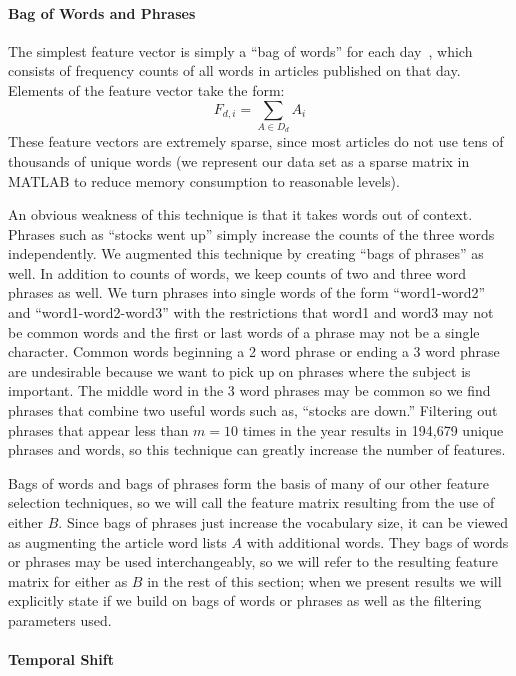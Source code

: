 \documentclass[10pt]{scrartcl}
\begin{document}
\paragraph{Bag of Words and Phrases}

The simplest feature vector is simply a ``bag of words'' for each day~\cite{featurehash}, which consists of frequency counts of all words in articles published on that day. Elements of the feature vector take the form: $$\displaystyle F_{d,i} = \sum_{A \in D_d}{A_i}$$ These feature vectors are extremely sparse, since most articles do not use tens of thousands of unique words (we represent our data set as a sparse matrix
in MATLAB to reduce memory consumption to reasonable levels).

An obvious weakness of this technique is that it takes words out of context. Phrases such as ``stocks went up'' simply increase the counts of the three words independently. We augmented this technique by creating ``bags of phrases'' as well. In addition to counts of words, we keep counts of two and three word phrases
as well. We turn phrases into single words of the form ``word1-word2'' and ``word1-word2-word3'' with the restrictions that word1 and word3 may not be common words and the first or last words of a phrase may not be a single character. Common words beginning a 2 word phrase or ending a 3 word phrase are undesirable because we want to pick up on phrases where the subject is important. The middle word in the 3 word phrases may be common so we find phrases that combine two useful words such as, ``stocks are down.'' Filtering out phrases that appear less than $m = 10$ times in the year results in 194,679 unique phrases and words, so this technique can greatly increase the number of features.

Bags of words and bags of phrases form the basis of many of our other feature selection techniques, so we will call the feature matrix resulting from the use of either $B$. Since bags of phrases just increase the vocabulary size, it can be viewed as augmenting the article word lists $A$ with additional words. They bags of words or phrases may be used interchangeably, so we will refer to the resulting feature matrix for either as $B$ in the rest of this section; when we present results we will explicitly state if we build on bags of words or phrases as well as the filtering parameters used.

\paragraph{Temporal Shift}
\end{document}
